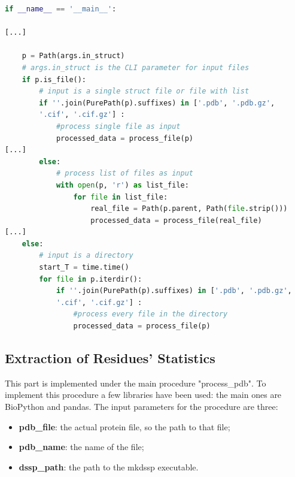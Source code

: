 \begin{lstlisting}[language=Python, caption=Input\ files\ parsing]
if __name__ == '__main__':
    
[...]
    
    p = Path(args.in_struct)
    # args.in_struct is the CLI parameter for input files
    if p.is_file():
        # input is a single struct file or file with list
        if ''.join(PurePath(p).suffixes) in ['.pdb', '.pdb.gz', 
        '.cif', '.cif.gz'] :
            #process single file as input
            processed_data = process_file(p)
[...]
        else:
            # process list of files as input 
            with open(p, 'r') as list_file:
                for file in list_file:
                    real_file = Path(p.parent, Path(file.strip()))
                    processed_data = process_file(real_file)
[...]
    else:
        # input is a directory
        start_T = time.time()
        for file in p.iterdir():
            if ''.join(PurePath(p).suffixes) in ['.pdb', '.pdb.gz',
            '.cif', '.cif.gz'] :
                #process every file in the directory
                processed_data = process_file(p)
\end{lstlisting}


\subsection{Extraction of Residues' Statistics}

This part is implemented under the main procedure "process\_pdb". To implement this procedure a few libraries have been used: the main ones are BioPython and pandas. The input parameters for the procedure are three:
\begin{itemize}
    \item \textbf{pdb\_file}: the actual protein file, so the path to that file;
    \item \textbf{pdb\_name}: the name of the file;
    \item \textbf{dssp\_path}: the path to the mkdssp executable.
\end{itemize}
